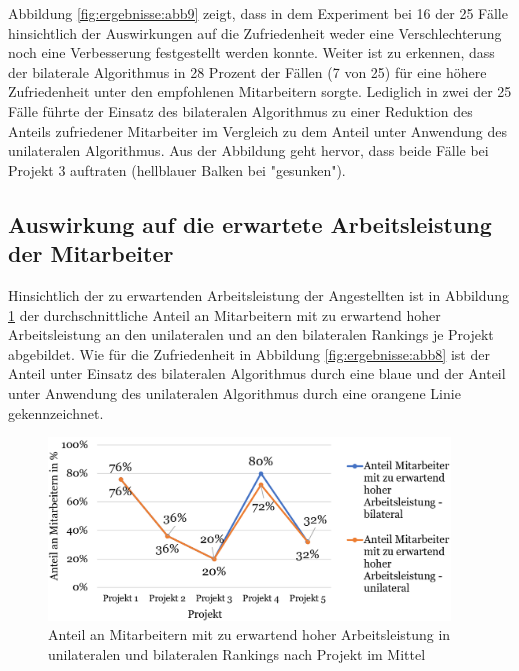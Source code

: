 Abbildung \ref{fig:ergebnisse:abb9} zeigt, dass in dem Experiment bei 16 der 25 Fälle hinsichtlich der Auswirkungen auf die Zufriedenheit weder eine Verschlechterung noch eine Verbesserung festgestellt werden konnte.
Weiter ist zu erkennen, dass der bilaterale Algorithmus in 28 Prozent der Fällen (7 von 25) für eine höhere Zufriedenheit unter den empfohlenen Mitarbeitern sorgte.
Lediglich in zwei der 25 Fälle führte der Einsatz des bilateralen Algorithmus zu einer Reduktion des Anteils zufriedener Mitarbeiter im Vergleich zu dem Anteil unter Anwendung des unilateralen Algorithmus.
Aus der Abbildung geht hervor, dass beide Fälle bei Projekt 3 auftraten (hellblauer Balken bei "gesunken").


\subsection{Auswirkung auf die erwartete Arbeitsleistung der Mitarbeiter}
Hinsichtlich der zu erwartenden Arbeitsleistung der Angestellten ist in Abbildung \ref{fig:ergebnisse:abb10} der durchschnittliche Anteil an Mitarbeitern mit zu erwartend hoher Arbeitsleistung an den unilateralen und an den bilateralen Rankings je Projekt abgebildet.
Wie für die Zufriedenheit in Abbildung \ref{fig:ergebnisse:abb8} ist der Anteil unter Einsatz des bilateralen Algorithmus durch eine blaue und der Anteil unter Anwendung des unilateralen Algorithmus durch eine orangene Linie gekennzeichnet.

\begin{figure}[H]
    \centering
	\includegraphics[width=0.95\textwidth]{gfx/verhaeltnis-a-durchschnitt-projekte.png}
	\caption[Anteil an Mitarbeitern mit zu erwartend hoher Arbeitsleistung in unilateralen und bilateralen Rankings nach Projekt im Mittel]{Anteil an Mitarbeitern mit zu erwartend hoher Arbeitsleistung in unilateralen und bilateralen Rankings nach Projekt im Mittel}
	\label{fig:ergebnisse:abb10}
\end{figure}

